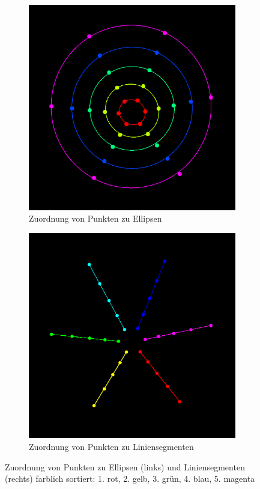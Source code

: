 \begin{figure}[!htb]
	\centering
	\begin{subfigure}{.5\textwidth}
		\centering
		\includegraphics[width=.9\textwidth]{images/ellipseMapping.png}
		\caption{Zuordnung von Punkten zu Ellipsen}
		\label{fig:ellipseMapping}
	\end{subfigure}%
	\begin{subfigure}{.5\textwidth}
		\centering
		\includegraphics[width=.9\textwidth]{images/lineMapping.png}
		\caption{Zuordnung von Punkten zu Liniensegmenten}
		\label{fig:lineMapping}
	\end{subfigure}
	\caption[Zuordnung von Punkten zu Ellipsen und Liniensegmenten]{Zuordnung von Punkten zu Ellipsen (links) und Liniensegmenten (rechts) farblich sortiert: 1. rot, 2. gelb, 3. grün, 4. blau, 5. magenta}
	\label{fig:mapping}
\end{figure}


